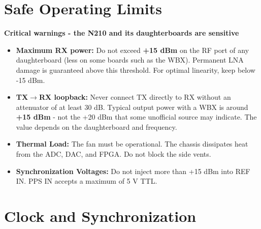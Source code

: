 \documentclass[11pt]{article}
\begin{document}
\section{Safe Operating Limits}

\begin{warningbox}
\textbf{Critical warnings - the N210 and its daughterboards are sensitive}
\end{warningbox}

\vspace{4pt}
\begin{itemize}
    \item \textbf{Maximum RX power:} Do not exceed \textbf{+15 dBm} on the RF port of any daughterboard (less on some boards such as the WBX). Permanent LNA damage is guaranteed above this threshold. For optimal linearity, keep below -15 dBm.
    \item \textbf{TX$\to$RX loopback:} Never connect TX directly to RX without an attenuator of at least 30 dB. Typical output power with a WBX is around \textbf{+15 dBm} - not the +20 dBm that some unofficial source may indicate. The value depends on the daughterboard and frequency.
    \item \textbf{Thermal Load:} The fan must be operational. The chassis dissipates heat from the ADC, DAC, and FPGA. Do not block the side vents.
    \item \textbf{Synchronization Voltages:} Do not inject more than +15 dBm into REF IN. PPS IN accepts a maximum of 5 V TTL.
\end{itemize}

\section{Clock and Synchronization}
\end{document}
